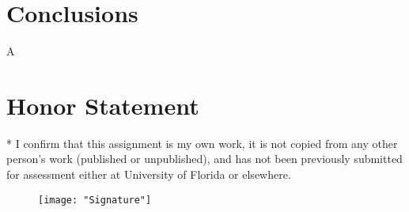 \documentclass[conference]{IEEEtran}
\begin{document}
\section{Conclusions} \label{Conclusions}
A

\section*{Honor Statement}
\noindent
* I confirm that this assignment is my own work, it is not copied from any other person's work (published or unpublished), and has not been previously submitted for assessment either at University of Florida or elsewhere.

\begin{figure}[h!]
	\centering
	\texttt{[image: "Signature"]}
\end{figure}
\end{document}

